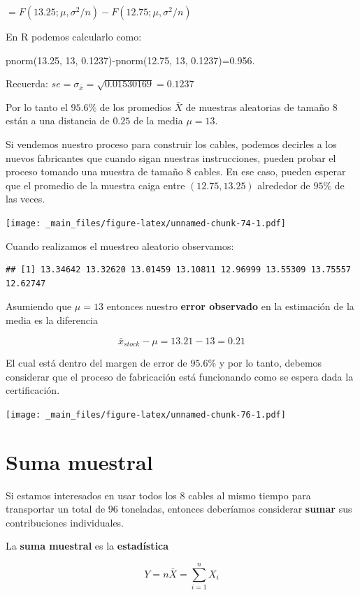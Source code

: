 \documentclass[
]{book}
\begin{document}
\(=F(13.25; \mu, \sigma^2/n)-F(12.75; \mu, \sigma^2/n)\)

En R podemos calcularlo como:

pnorm(13.25, 13, 0.1237)-pnorm(12.75, 13, 0.1237)=0.956.

Recuerda: \(se=\sigma_{\bar{x}}=\sqrt{0.01530169}=0.1237\)

Por lo tanto el \(95.6\%\) de los promedios \(\bar{X}\) de muestras aleatorias de tamaño \(8\) están a una distancia de \(0.25\) de la media \(\mu=13\).

Si vendemos nuestro proceso para construir los cables, podemos decirles a los nuevos fabricantes que cuando sigan nuestras instrucciones, pueden probar el proceso tomando una muestra de tamaño \(8\) cables. En ese caso, pueden esperar que el promedio de la muestra caiga entre \((12.75, 13.25)\) alrededor de \(95\%\) de las veces.

\texttt{[image: \_main\_files/figure-latex/unnamed-chunk-74-1.pdf]}

Cuando realizamos el muestreo aleatorio observamos:

\begin{verbatim}
## [1] 13.34642 13.32620 13.01459 13.10811 12.96999 13.55309 13.75557 12.62747
\end{verbatim}

Asumiendo que \(\mu=13\) entonces nuestro \textbf{error observado} en la estimación de la media es la diferencia

\[\bar{x}_{stock}-\mu=13.21-13=0.21\]

El cual está dentro del margen de error de \(95.6\%\) y por lo tanto, debemos considerar que el proceso de fabricación está funcionando como se espera dada la certificación.

\texttt{[image: \_main\_files/figure-latex/unnamed-chunk-76-1.pdf]}

\hypertarget{suma-muestral}{%
\section{Suma muestral}\label{suma-muestral}}

Si estamos interesados en usar todos los \(8\) cables al mismo tiempo para transportar un total de \(96\) toneladas, entonces deberíamos considerar \textbf{sumar} sus contribuciones individuales.

La \textbf{suma muestral} es la \textbf{estadística}

\[Y=n \bar{X}=\sum_{i=1}^n X_i\]
\end{document}
